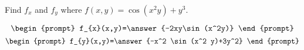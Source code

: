 \documentclass{ximera}
\author{David Guichard \and Neal Koblitz \and H. Jerome Keisler \and Albert Scheller \and Barry Balof \and Mike Wills \and Matthew Carr}
\begin{document}
\begin{exercise}




Find $f_x$ and $f_y$ where $f(x,y)=\cos(x^2 y)+y^3$. 

\[
\begin{prompt}
f_{x}(x,y)=\answer{-2xy\sin(x^2y)}
\end{prompt}
\]
\[
\begin{prompt}
f_{y}(x,y)=\answer{-x^2 \sin(x^2 y)+3y^2}
\end{prompt}
\]

\end{exercise}
\end{document}
